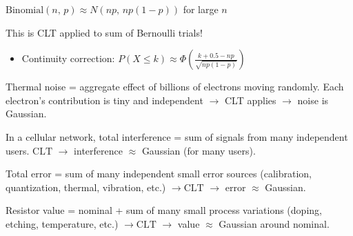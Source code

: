 
$\mathrm{Binomial}(n,\, p) \approx N(np,\, np(1-p))$ for large $n$

This is CLT applied to sum of Bernoulli trials!

\begin{itemize}
\tightlist
\item
  Continuity correction: $P(X \le k) \approx \Phi \left(\frac{k + 0.5 - np}{\sqrt{np(1-p)}}\right)$
\end{itemize}



Thermal noise = aggregate effect of billions of electrons moving randomly. Each electron’s contribution is tiny and independent \ensuremath{\to} CLT applies \ensuremath{\to} noise is Gaussian.


In a cellular network, total interference = sum of signals from many independent users. $\mathrm{CLT}$ \ensuremath{\to} interference \ensuremath{\approx} Gaussian (for many users).


Total error = sum of many independent small error sources (calibration, quantization, thermal, vibration, etc.) $\to \mathrm{CLT}$ \ensuremath{\to} error \ensuremath{\approx} Gaussian.


Resistor value = nominal + sum of many small process variations (doping, etching, temperature, etc.) $\to \mathrm{CLT}$ \ensuremath{\to} value \ensuremath{\approx} Gaussian around nominal.


